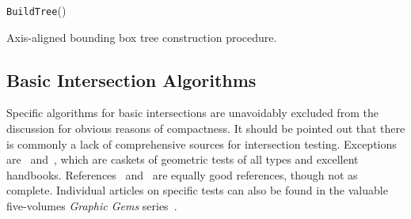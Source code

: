 \begin{algorithm}[!ht]
  \texttt{BuildTree}{(\Entities{})}\\
  \caption{Axis-aligned bounding box tree construction procedure.}
  \label{algorithm::tree}
\end{algorithm}

\subsection{Basic Intersection Algorithms}
Specific algorithms for basic intersections are unavoidably excluded from the discussion for obvious reasons of compactness. It should be pointed out that there is commonly a lack of comprehensive sources for intersection testing. Exceptions are~\cite{schneider2002geometric} and~\cite{eberly2020robust}, which are caskets of geometric tests of all types and excellent handbooks. References~\cite{ericson2004realtime} and~\cite{vandenbergen2003collision} are equally good references, though not as complete. Individual articles on specific tests can also be found in the valuable five-volumes \emph{Graphic Gems} series~\cite{glassner1990graphics, arvo1991graphics, kirk1992graphics, heckbert1994graphics, paeth1995graphics}.

